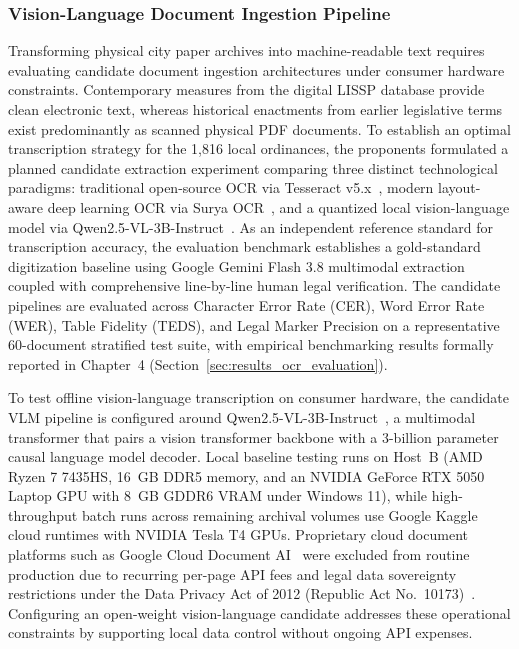         \subsubsection{Vision-Language Document Ingestion Pipeline}
        \label{sec:local_vlm_ingestion}
        Transforming physical city paper archives into machine-readable text requires evaluating candidate document ingestion architectures under consumer hardware constraints. Contemporary measures from the digital LISSP database provide clean electronic text, whereas historical enactments from earlier legislative terms exist predominantly as scanned physical PDF documents. To establish an optimal transcription strategy for the 1,816 local ordinances, the proponents formulated a planned candidate extraction experiment comparing three distinct technological paradigms: traditional open-source OCR via Tesseract v5.x~\cite{smith2007overview}, modern layout-aware deep learning OCR via Surya OCR~\cite{paruchuri2024surya}, and a quantized local vision-language model via Qwen2.5-VL-3B-Instruct~\cite{bai2025qwen25vl}. As an independent reference standard for transcription accuracy, the evaluation benchmark establishes a gold-standard digitization baseline using Google Gemini Flash 3.8 multimodal extraction coupled with comprehensive line-by-line human legal verification. The candidate pipelines are evaluated across Character Error Rate (CER), Word Error Rate (WER), Table Fidelity (TEDS), and Legal Marker Precision on a representative 60-document stratified test suite, with empirical benchmarking results formally reported in Chapter~4 (Section~\ref{sec:results_ocr_evaluation}).

        To test offline vision-language transcription on consumer hardware, the candidate VLM pipeline is configured around Qwen2.5-VL-3B-Instruct~\cite{bai2025qwen25vl}, a multimodal transformer that pairs a vision transformer backbone with a 3-billion parameter causal language model decoder. Local baseline testing runs on Host~B (AMD Ryzen 7 7435HS, 16~GB DDR5 memory, and an NVIDIA GeForce RTX 5050 Laptop GPU with 8~GB GDDR6 VRAM under Windows 11), while high-throughput batch runs across remaining archival volumes use Google Kaggle cloud runtimes with NVIDIA Tesla T4 GPUs. Proprietary cloud document platforms such as Google Cloud Document AI~\cite{google2024documentai} were excluded from routine production due to recurring per-page API fees and legal data sovereignty restrictions under the Data Privacy Act of 2012 (Republic Act No.~10173)~\cite{philgov2012ra10173}. Configuring an open-weight vision-language candidate addresses these operational constraints by supporting local data control without ongoing API expenses.

